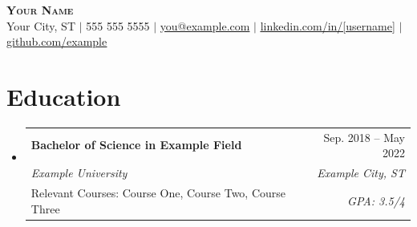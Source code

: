 \documentclass[letterpaper,10pt]{article}
\makeatletter
\newcommand{\resumeSubheadingTwo}[6]{
  \vspace{-2pt}\item
    \begin{tabular*}{0.97\textwidth}[t]{l@{\extracolsep{\fill}}r}
      \textbf{#1} & #2 \\
      \textit{\small#3} & \textit{\small #4} \\
      \small#5 & \textit{\small #6} \\
    \end{tabular*}\vspace{-9pt}
}
\newcommand{\resumeSubHeadingListStart}{\begin{itemize}[leftmargin=0.15in, label={}]}
\newcommand{\resumeSubHeadingListEnd}{\end{itemize}}
\makeatother
\begin{document}
\begin{center}
    \textbf{\Huge \scshape Your Name} \\ \vspace{1pt}
    \small Your City, ST $|$
    \small 555 555 5555 $|$ \underline{you@example.com} $|$
    \href{https://www.linkedin.com/in/[username]/}{\underline{linkedin.com/in/[username]}} $|$
    \href{https://github.com/example}{\underline{github.com/example}}
\end{center}


\section{Education}
  \resumeSubHeadingListStart
    \resumeSubheadingTwo
      {Bachelor of Science in Example Field}{Sep. 2018 -- May 2022}
      {Example University}{Example City, ST}
      {Relevant Courses: Course One, Course Two, Course Three}{GPA: 3.5/4}
  \resumeSubHeadingListEnd

\end{document}
